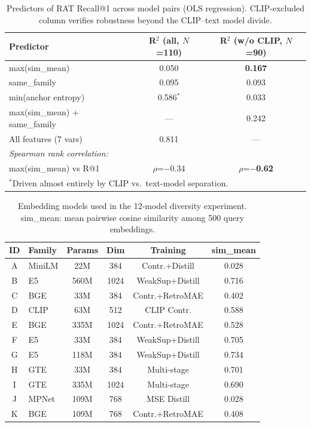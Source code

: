 \begin{table}[t]
\centering
\caption{Predictors of RAT Recall@1 across model pairs (OLS regression).
CLIP-excluded column verifies robustness beyond the CLIP--text model divide.}
\label{tab:predictors}
\small
\begin{tabular}{lcc}
\toprule
Predictor & R$^2$ (all, $N$=110) & R$^2$ (w/o CLIP, $N$=90) \\
\midrule
max(sim\_mean) & 0.050 & \textbf{0.167} \\
same\_family & 0.095 & 0.093 \\
min(anchor entropy) & 0.586$^*$ & 0.033 \\
max(sim\_mean) + same\_family & --- & 0.242 \\
All features (7 vars) & 0.811 & --- \\
\midrule
\multicolumn{3}{l}{\textit{Spearman rank correlation:}} \\
max(sim\_mean) vs R@1 & $\rho$=$-$0.34 & $\rho$=$-$\textbf{0.62} \\
\bottomrule
\multicolumn{3}{l}{\scriptsize $^*$Driven almost entirely by CLIP vs.\ text-model separation.} \\
\end{tabular}
\end{table}

\begin{table}[t]
\centering
\caption{Embedding models used in the 12-model diversity experiment. sim\_mean: mean pairwise cosine similarity among 500 query embeddings.}
\label{tab:models}
\small
\begin{tabular}{clcccc}
\toprule
ID & Family & Params & Dim & Training & sim\_mean \\
\midrule
A & MiniLM & 22M & 384 & Contr.+Distill & 0.028 \\
B & E5 & 560M & 1024 & WeakSup+Distill & 0.716 \\
C & BGE & 33M & 384 & Contr.+RetroMAE & 0.402 \\
D & CLIP & 63M & 512 & CLIP Contr. & 0.588 \\
E & BGE & 335M & 1024 & Contr.+RetroMAE & 0.528 \\
F & E5 & 33M & 384 & WeakSup+Distill & 0.705 \\
G & E5 & 118M & 384 & WeakSup+Distill & 0.734 \\
H & GTE & 33M & 384 & Multi-stage & 0.701 \\
I & GTE & 335M & 1024 & Multi-stage & 0.690 \\
J & MPNet & 109M & 768 & MSE Distill & 0.028 \\
K & BGE & 109M & 768 & Contr.+RetroMAE & 0.408 \\
\bottomrule
\end{tabular}
\end{table}